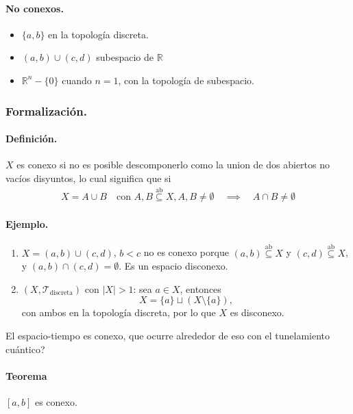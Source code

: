 \paragraph{\textbf{No conexos.}}
\begin{itemize}
  \item $\{a,b\}$ en la topología discreta.
  \item $(a,b) \cup (c,d)$ subespacio de \(\mathbb R\) 
  \item $\mathbb R^n - \{0\}$ cuando $n=1$, con la topología de subespacio.
\end{itemize}

\subsubsection{Formalización.}


\paragraph{\textbf{Definición.}} $X$ es conexo si no es posible descomponerlo como la union de dos abiertos no vacíos disyuntos, lo cual significa que si
\begin{align*}
X = A \cup B \quad \text{con } A,B \overset{\text{ab}}\subseteq X, A,B \neq \emptyset \quad \implies  \quad A \cap B \neq \emptyset
\end{align*}
\paragraph{\textbf{Ejemplo.}}
\begin{enumerate}[label=(\alph*)]
  \item $X = (a,b) \cup (c,d)$, $b<c$ no es conexo porque $(a,b)\overset{\text{ab}}\subseteq X$ y $(c,d)\overset{\text{ab}}\subseteq X$, y $(a,b)\cap(c,d)=\emptyset$. Es un espacio disconexo.
  \item $(X,\mathcal T_{\mathrm{discreta}})$ con $|X|>1$: sea $a\in X$, entonces
        \[
          X = \{a\} \sqcup (X \setminus \{a\}), 
        \]
        con ambos en la topología discreta, por lo que $X$ es disconexo.
\end{enumerate}

El espacio-tiempo es conexo, que ocurre alrededor de eso con el tunelamiento cuántico?

\paragraph{\textbf{Teorema}} $[a,b]$ es conexo.

